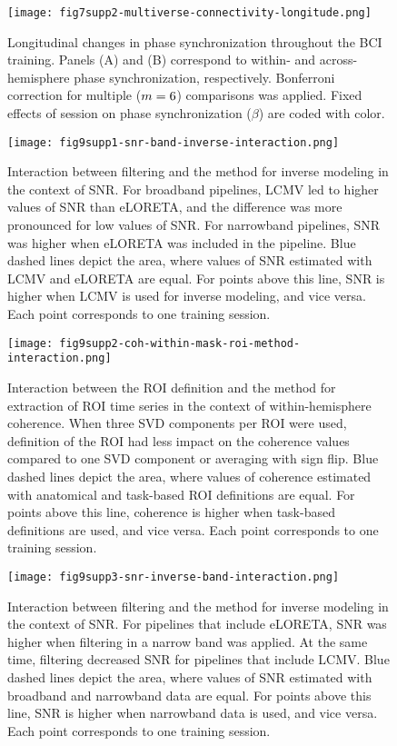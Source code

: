 \begin{figure}[htbp]
    \centering
    \texttt{[image: fig7supp2-multiverse-connectivity-longitude.png]}
    \caption{Longitudinal changes in phase synchronization throughout the BCI training. Panels (A) and (B) correspond to within- and across-hemisphere phase synchronization, respectively. Bonferroni correction for multiple ($m = 6$) comparisons was applied. Fixed effects of session on phase synchronization ($\beta$) are coded with color.}
    \label{fig:multiverse_connectivity_longitude}
\end{figure}

\begin{figure}[htbp]
    \centering
    \texttt{[image: fig9supp1-snr-band-inverse-interaction.png]}
    \caption{Interaction between filtering and the method for inverse modeling in the context of SNR. For broadband pipelines, LCMV led to higher values of SNR than eLORETA, and the difference was more pronounced for low values of SNR. For narrowband pipelines, SNR was higher when eLORETA was included in the pipeline. Blue dashed lines depict the area, where values of SNR estimated with LCMV and eLORETA are equal. For points above this line, SNR is higher when LCMV is used for inverse modeling, and vice versa. Each point corresponds to one training session.}
    \label{fig:snr_band_inverse}
\end{figure}

\begin{figure}[htbp]
    \centering
    \texttt{[image: fig9supp2-coh-within-mask-roi-method-interaction.png]}
    \caption{Interaction between the ROI definition and the method for extraction of ROI time series in the context of within-hemisphere coherence. When three SVD components per ROI were used, definition of the ROI had less impact on the coherence values compared to one SVD component or averaging with sign flip. Blue dashed lines depict the area, where values of coherence estimated with anatomical and task-based ROI definitions are equal. For points above this line, coherence is higher when task-based definitions are used, and vice versa. Each point corresponds to one training session.}
    \label{fig:coh_within_mask_roi_method}
\end{figure}

\begin{figure}[htbp]
    \centering
    \texttt{[image: fig9supp3-snr-inverse-band-interaction.png]}
    \caption{Interaction between filtering and the method for inverse modeling in the context of SNR. For pipelines that include eLORETA, SNR was higher when filtering in a narrow band was applied. At the same time, filtering decreased SNR for pipelines that include LCMV. Blue dashed lines depict the area, where values of SNR estimated with broadband and narrowband data are equal. For points above this line, SNR is higher when narrowband data is used, and vice versa. Each point corresponds to one training session.}
    \label{fig:snr_inverse_band}
\end{figure}
